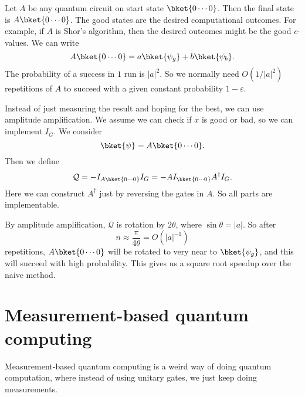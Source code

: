 \documentclass[a4paper]{article}
\begin{document}
\begin{eg}
  Let $A$ be any quantum circuit on start state $\bket{0\cdots0}$. Then the final state is $A \bket{0\cdots0}$. The good states are the desired computational outcomes. For example, if $A$ is Shor's algorithm, then the desired outcomes might be the good $c$-values. We can write
  \[
    A\bket{0\cdots0} = a \bket{\psi_g} + b \bket{\psi_b}.
  \]
  The probability of a success in $1$ run is $|a|^2$. So we normally need $O(1/|a|^2)$ repetitions of $A$ to succeed with a given constant probability $1 - \varepsilon$.

  Instead of just measuring the result and hoping for the best, we can use amplitude amplification. We assume we can check if $x$ is good or bad, so we can implement $I_G$. We consider
  \[
    \bket{\psi} = A \bket{0\cdots0}.
  \]
  Then we define
  \[
    \mathcal{Q} = - I_{A\bket{0\cdots0}} I_G = - A I_{\bket{0\cdots0}} A^\dagger I_G.
  \]
  Here we can construct $A^\dagger$ just by reversing the gates in $A$. So all parts are implementable.

  By amplitude amplification, $\mathcal{Q}$ is rotation by $2 \theta$, where $\sin \theta = |a|$. So after
  \[
    n \approx \frac{\pi}{4 \theta} = O(|a|^{-1})
  \]
  repetitions, $A \bket{0\cdots 0}$ will be rotated to very near to $\bket{\psi_g}$, and this will succeed with high probability. This gives us a square root speedup over the naive method.
\end{eg}

\section{Measurement-based quantum computing}
Measurement-based quantum computing is a weird way of doing quantum computation, where instead of using unitary gates, we just keep doing measurements.
\end{document}
